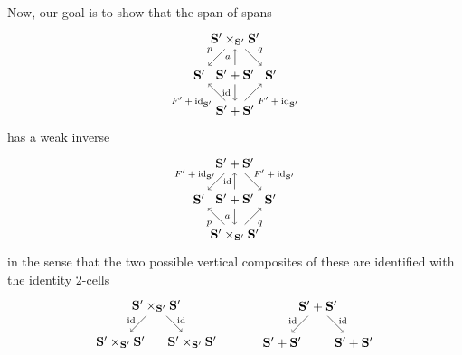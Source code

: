 \documentclass[11pt]{amsart}
\newcommand{\cat}[1]{\mathbf{#1}}
\DeclareMathOperator{\id}{id}
\theoremstyle{remark}
\theoremstyle{definition}
\begin{document}
Now, our goal is to show that the span of spans 
\[
\begin{tikzpicture}
	\node (lleg) at (-1,0) {$\cat{S}'$};
	\node (uapex) at (0,1) {$\cat{S}'\times_{\cat{S}'}\cat{S}'$};
	\node (lapex) at (0,-1) {$\cat{S}'+\cat{S}'$};
	\node (rleg) at (1,0) {$\cat{S}'$};
	\node (mid) at (0,0) {$\cat{S}'+\cat{S}'$};
	\draw [->] (uapex) to node[above left] {\scriptsize $p$} (lleg);
	\draw [->] (uapex) to node[above right] {\scriptsize $q$} (rleg);
	\draw [->] (lapex) to node[below left] {\scriptsize $F'+\id_{\cat{S}'}$} (lleg);
	\draw [->] (lapex) to node[below right] {\scriptsize $F'+\id_{\cat{S}'}$} (rleg);
	\draw [<-] (uapex) to node[left] {\scriptsize $a$} (mid);
	\draw [<-] (lapex) to node[left] {\scriptsize $\id$} (mid);
\end{tikzpicture}
\]
has a weak inverse
\[
\begin{tikzpicture}
	\node (lleg) at (-1,0) {$\cat{S}'$};
	\node (lapex) at (0,-1) {$\cat{S}'\times_{\cat{S}'}\cat{S}'$};
	\node (uapex) at (0,1) {$\cat{S}'+\cat{S}'$};
	\node (rleg) at (1,0) {$\cat{S}'$};
	\node (mid) at (0,0) {$\cat{S}'+\cat{S}'$};
	\draw [->] (lapex) to node[shift={(-0.2,-0.2)}] {\scriptsize $p$} (lleg);
	\draw [->] (lapex) to node[shift={(0.2,-0.2)}] {\scriptsize $q$} (rleg);
	\draw [->] (uapex) to node[shift={(-0.6,0.2)}] {\scriptsize $F'+\id_{\cat{S}'}$} (lleg);
	\draw [->] (uapex) to node[shift={(0.6,0.2)}] {\scriptsize $F'+\id_{\cat{S}'}$} (rleg);
	\draw [<-] (lapex) to node[shift={(-0.2,0)}] {\scriptsize $a$} (mid);
	\draw [<-] (uapex) to node[shift={(-0.2,0)}] {\scriptsize $\id$} (mid);
\end{tikzpicture}
\]
in the sense that the two possible vertical composites of these are identified with the identity $2$-cells 
\[
\begin{tikzpicture}
	\node (v1) at (0,2) {$\cat{S'} \times_{\cat{S'}} \cat{S'}$};
	\node (v2) at (-1,1) {$\cat{S'} \times_{\cat{S'}} \cat{S'}$};
	\node (v3) at (1,1) {$\cat{S'} \times_{\cat{S'}} \cat{S'}$};
	\draw [->] (v1) to node[shift={(-0.2,0.1)}] {\scriptsize $\id$} (v2);
	\draw [->] (v1) to node[shift={(0.2,0.1)}] {\scriptsize $\id$} (v3);
\end{tikzpicture}
%
\quad \quad \quad
%
\begin{tikzpicture}
	\node (v1) at (0,2) {$\cat{S'} + \cat{S'}$};
	\node (v2) at (-1,1) {$\cat{S'} + \cat{S'}$};
	\node (v3) at (1,1) {$\cat{S'} + \cat{S'}$};
	\draw [->] (v1) to node[shift={(-0.2,0.1)}] {\scriptsize $\id$} (v2);
	\draw [->] (v1) to node[shift={(0.2,0.1)}] {\scriptsize $\id$} (v3);
\end{tikzpicture}
\]
\end{document}
